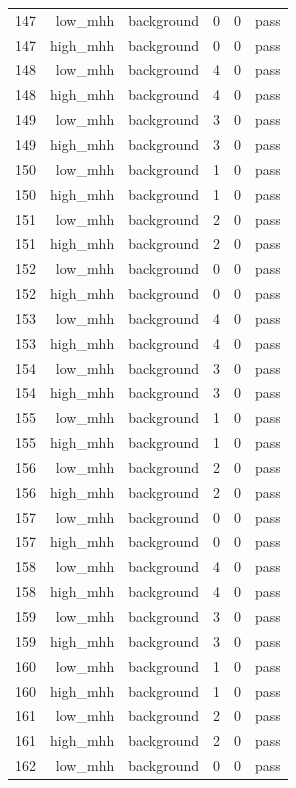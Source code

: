 \begin{table}[htbp]
{\begin{tabular}{lrrrrr}
147 & low\_mhh & background & 0 & 0 & pass \\
147 & high\_mhh & background & 0 & 0 & pass \\
148 & low\_mhh & background & 4 & 0 & pass \\
148 & high\_mhh & background & 4 & 0 & pass \\
149 & low\_mhh & background & 3 & 0 & pass \\
149 & high\_mhh & background & 3 & 0 & pass \\
150 & low\_mhh & background & 1 & 0 & pass \\
150 & high\_mhh & background & 1 & 0 & pass \\
151 & low\_mhh & background & 2 & 0 & pass \\
151 & high\_mhh & background & 2 & 0 & pass \\
152 & low\_mhh & background & 0 & 0 & pass \\
152 & high\_mhh & background & 0 & 0 & pass \\
153 & low\_mhh & background & 4 & 0 & pass \\
153 & high\_mhh & background & 4 & 0 & pass \\
154 & low\_mhh & background & 3 & 0 & pass \\
154 & high\_mhh & background & 3 & 0 & pass \\
155 & low\_mhh & background & 1 & 0 & pass \\
155 & high\_mhh & background & 1 & 0 & pass \\
156 & low\_mhh & background & 2 & 0 & pass \\
156 & high\_mhh & background & 2 & 0 & pass \\
157 & low\_mhh & background & 0 & 0 & pass \\
157 & high\_mhh & background & 0 & 0 & pass \\
158 & low\_mhh & background & 4 & 0 & pass \\
158 & high\_mhh & background & 4 & 0 & pass \\
159 & low\_mhh & background & 3 & 0 & pass \\
159 & high\_mhh & background & 3 & 0 & pass \\
160 & low\_mhh & background & 1 & 0 & pass \\
160 & high\_mhh & background & 1 & 0 & pass \\
161 & low\_mhh & background & 2 & 0 & pass \\
161 & high\_mhh & background & 2 & 0 & pass \\
162 & low\_mhh & background & 0 & 0 & pass \\

\end{tabular}}
\end{table}
